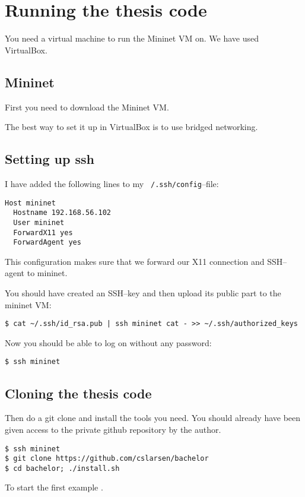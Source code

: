 \chapter{Running the thesis code}

You need a virtual machine to run the Mininet VM on.  We have used
VirtualBox.

\section{Mininet}

First you need to download the Mininet VM.

The best way to set it up in VirtualBox is to use bridged
networking.

\section{Setting up ssh}

I have added the following lines to my \texttt{~/.ssh/config}--file:

\begin{verbatim}
Host mininet
  Hostname 192.168.56.102
  User mininet
  ForwardX11 yes
  ForwardAgent yes
\end{verbatim}

This configuration makes sure that we forward our X11 connection and
SSH--agent to mininet.

You should have created an SSH--key and then upload its public part to the
mininet VM:

\begin{verbatim}
$ cat ~/.ssh/id_rsa.pub | ssh mininet cat - >> ~/.ssh/authorized_keys
\end{verbatim}

Now you should be able to log on without any password:

\begin{verbatim}
$ ssh mininet
\end{verbatim}

\section{Cloning the thesis code}

Then do a git clone and install the tools you need. You should already have
been given access to the private github repository by the author.

\begin{Verbatim}
$ ssh mininet
$ git clone https://github.com/cslarsen/bachelor
$ cd bachelor; ./install.sh
\end{Verbatim}

To start the first example .
